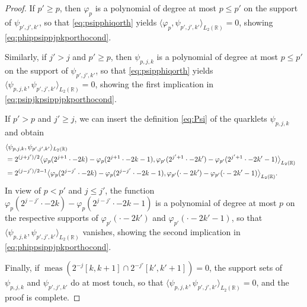 \documentclass{article}
\DeclareMathOperator{\meas}{meas}
\begin{document}
\begin{proof}
If $p'\ge p$, then $\varphi_p$ is a polynomial of degree at most $p\le p'$ on the support of $\psi_{p',j',k'}$, so that \eqref{eq:psipphiqorth} yields $\langle\varphi_p,\psi_{p',j',k'}\rangle_{L_2(\mathbb R)}=0$, showing \eqref{eq:phippsippjpkporthocond}.

Similarly, if $j'>j$ and $p'\ge p$, then $\psi_{p,j,k}$ is a polynomial of degree at most $p\le p'$ on the support of $\psi_{p',j',k'}$, so that \eqref{eq:psipphiqorth} yields  $\langle\psi_{p,j,k},\psi_{p',j',k'}\rangle_{L_2(\mathbb R)}=0$, showing the first implication in \eqref{eq:psipjkpsippjpkporthocond}.

If $p'>p$ and $j'\ge j$, we can insert the definition \eqref{eq:Psi} of the quarklets $\psi_{p,j,k}$ and obtain
\begin{align*}
\lefteqn{\langle \psi_{p,j,k},\psi_{p',j',k'}\rangle_{L_2(\mathbb R)}}\\
&=
2^{(j+j')/2}\big\langle\varphi_p(2^{j+1}\cdot-2k)-\varphi_p(2^{j+1}\cdot-2k-1),\varphi_{p'}(2^{j'+1}\cdot-2k')-\varphi_{p'}(2^{j'+1}\cdot-2k'-1)\big\rangle_{L_2(\mathbb R)}\\
&=
2^{(j-j')/2-1}\big\langle\varphi_p(2^{j-j'}\cdot-2k)-\varphi_p(2^{j-j'}\cdot-2k-1),\varphi_{p'}(\cdot-2k')-\varphi_{p'}(\cdot-2k'-1)\big\rangle_{L_2(\mathbb R)}.
\end{align*}
In view of $p<p'$ and $j\le j'$, the function $\varphi_p(2^{j-j'}\cdot-2k)-\varphi_p(2^{j-j'}\cdot-2k-1)$ is a polynomial of degree at most $p$ on the respective supports of $\varphi_{p'}(\cdot-2k')$ and $\varphi_{p'}(\cdot-2k'-1)$, so that $\langle\psi_{p,j,k},\psi_{p',j',k'}\rangle_{L_2(\mathbb R)}$ vanishes, showing the second implication in \eqref{eq:phippsippjpkporthocond}.

Finally, if $\meas(2^{-j}[k,k+1]\cap 2^{-j'}[k',k'+1])=0$, the support sets of $\psi_{p,j,k}$ and $\psi_{p',j',k'}$ do at most touch, so that $\langle\psi_{p,j,k},\psi_{p',j',k'}\rangle_{L_2(\mathbb R)}=0$, and the proof is complete.
\end{proof}
\end{document}
